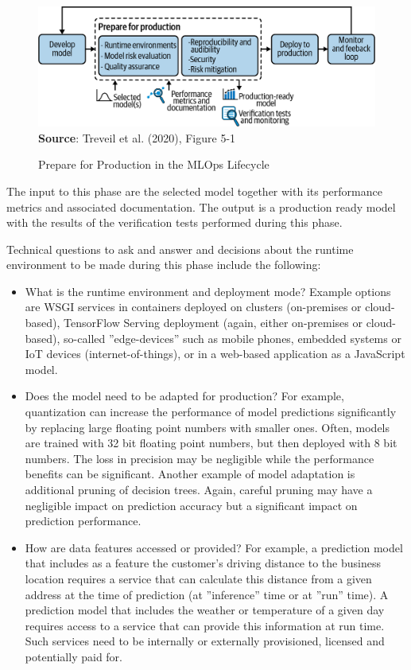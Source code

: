 \begin{figure}[h]
\centering
\includegraphics[width=.75\textwidth]{imlo_0501.png} \\

\vspace{\baselineskip}
\scriptsize \textbf{Source}: Treveil et al. (2020), Figure 5-1
\caption{Prepare for Production in the MLOps Lifecycle}
\label{fig:prepareforproduction}
\end{figure}

The input to this phase are the selected model together with its performance metrics and associated documentation. The output is a production ready model with the results of the verification tests performed during this phase. 

Technical questions to ask and answer and decisions about the runtime environment to be made during this phase include the following:
\begin{itemize}
   \item What is the runtime environment and deployment mode? Example options are WSGI services in containers deployed on clusters (on-premises or cloud-based), TensorFlow Serving deployment (again, either on-premises or cloud-based), so-called ''edge-devices'' such as mobile phones, embedded systems or IoT devices (internet-of-things), or in a web-based application as a JavaScript model.
   \item Does the model need to be adapted for production? For example, quantization can increase the performance of model predictions significantly by replacing large floating point numbers with smaller ones. Often, models are trained with 32 bit floating point numbers, but then deployed with 8 bit numbers. The loss in precision may be negligible while the performance benefits can be significant. Another example of model adaptation is additional pruning of decision trees. Again, careful pruning may have a negligible impact on prediction accuracy but a significant impact on prediction performance. 
   \item How are data features accessed or provided? For example, a prediction model that includes as a feature the customer's driving distance to the business location requires a service that can calculate this distance from a given address at the time of prediction (at ''inference'' time or at ''run'' time). A prediction model that includes the weather or temperature of a given day requires access to a service that can provide this information at run time. Such services need to be internally or externally provisioned, licensed and potentially paid for. 
\end{itemize}

